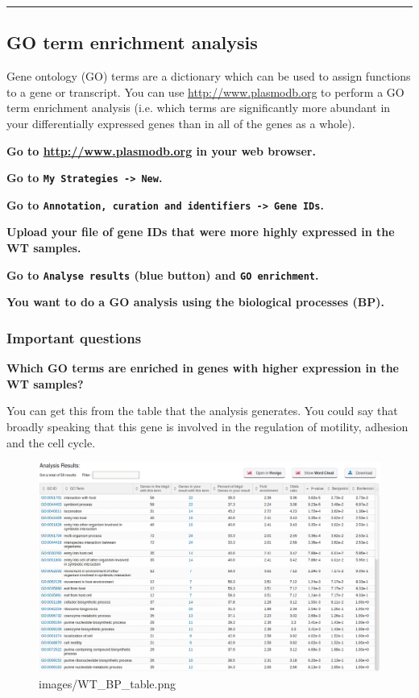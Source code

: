 \documentclass[11pt]{article}
\makeatletter
\def\maxwidth{\ifdim\Gin@nat@width>\linewidth\linewidth
    \else\Gin@nat@width\fi}
\let\Oldincludegraphics\includegraphics
\renewcommand{\includegraphics}[1]{\Oldincludegraphics[width=.8\maxwidth, height=.55\textheight, keepaspectratio]{#1}}
\makeatother
\begin{document}
    \begin{center}\rule{0.5\linewidth}{\linethickness}\end{center}

    \subsection{GO term enrichment
analysis}\label{go-term-enrichment-analysis}

Gene ontology (GO) terms are a dictionary which can be used to assign
functions to a gene or transcript. You can use
\url{http://www.plasmodb.org} to perform a GO term enrichment analysis
(i.e. which terms are significantly more abundant in your differentially
expressed genes than in all of the genes as a whole).

\textbf{Go to \url{http://www.plasmodb.org} in your web browser.}

\textbf{Go to \texttt{My\ Strategies\ -\textgreater{}\ New}.}

\textbf{Go to
\texttt{Annotation,\ curation\ and\ identifiers\ -\textgreater{}\ Gene\ IDs}.}

\textbf{Upload your file of gene IDs that were more highly expressed in
the WT samples.}

\textbf{Go to \texttt{Analyse\ results} (blue button) and
\texttt{GO\ enrichment}.}

\textbf{You want to do a GO analysis using the biological processes
(BP).}

\subsubsection{Important questions}\label{important-questions}

\textbf{Which GO terms are enriched in genes with
higher expression in the WT samples?}

You can get this from the table that the analysis generates. You could
say that broadly speaking that this gene is involved in the regulation
of motility, adhesion and the cell cycle.

    \begin{figure}[!h]
\centering
\includegraphics{images/WT_BP_table.png}
\caption{images/WT\_BP\_table.png}
\end{figure}
\end{document}
